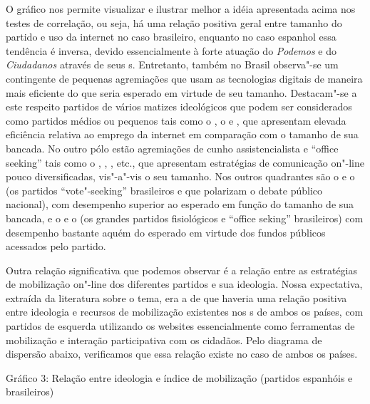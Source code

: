 O gráfico nos permite visualizar e ilustrar melhor a idéia apresentada
acima nos testes de correlação, ou seja, há uma relação positiva geral
entre tamanho do partido e uso da internet no caso brasileiro, enquanto
no caso espanhol essa tendência é inversa, devido essencialmente à forte
atuação do \emph{Podemos} e do \emph{Ciudadanos} através de seus s.
Entretanto, também no Brasil observa"-se um contingente de pequenas
agremiações que usam as tecnologias digitais de maneira mais eficiente
do que seria esperado em virtude de seu tamanho. Destacam"-se a este
respeito partidos de vários matizes ideológicos que podem ser
considerados como partidos médios ou pequenos tais como o , o  e
, que apresentam elevada eficiência relativa ao emprego da internet
em comparação com o tamanho de sua bancada. No outro pólo estão
agremiações de cunho assistencialista e ``office seeking'' tais como o
, , ,  etc., que apresentam estratégias de comunicação
on"-line pouco diversificadas, vis"-a"-vis o seu tamanho. Nos outros
quadrantes são o  e o  (os partidos ``vote"-seeking'' brasileiros e
que polarizam o debate público nacional), com desempenho superior ao
esperado em função do tamanho de sua bancada, e o  e o  (os
grandes partidos fisiológicos e ``office seking'' brasileiros) com
desempenho bastante aquém do esperado em virtude dos fundos públicos
acessados pelo partido.

Outra relação significativa que podemos observar é a relação entre as
estratégias de mobilização on"-line dos diferentes partidos e sua
ideologia. Nossa expectativa, extraída da literatura sobre o tema, era a
de que haveria uma relação positiva entre ideologia e recursos de
mobilização existentes nos s de ambos os países, com partidos de
esquerda utilizando os websites essencialmente como ferramentas de
mobilização e interação participativa com os cidadãos. Pelo diagrama de
dispersão abaixo, verificamos que essa relação existe no caso de ambos
os países.

\begin{center}
Gráfico 3: Relação entre ideologia e índice de mobilização (partidos
espanhóis e brasileiros)
\end{center}

